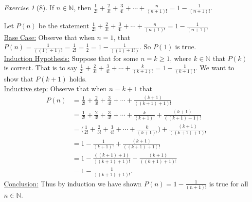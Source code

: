 \documentclass[12pt]{amsart}
\makeatletter
\theoremstyle{remark}
\newtheorem*{exercise}{Exercise}%
\def\NN{\ensuremath{\mathbb N}}
\renewenvironment{proof}[1][\proofname]{\par\doublespacing
  \pushQED{\qed}%
  \normalfont \topsep6\p@\@plus6\p@\relax
  \list{}{%
    \settowidth{\leftmargin}{\itshape\proofname:\hskip\labelsep}%
    \setlength{\labelwidth}{0pt}%
    \setlength{\itemindent}{-\leftmargin}%
  }%
  \item[\hskip\labelsep\itshape#1\@addpunct{:}]\ignorespaces
}{%
  \popQED\endlist\@endpefalse
  \singlespacing
}
\theoremstyle{mycomment}
\makeatother
\begin{document}
\begin{exercise}[8] If $n\in\NN$, then $\frac{1}{2!}+\frac{2}{3!}+\frac{3}{4!}+\cdots+\frac{n}{(n+1)!}=1-\frac{1}{(n+1)!}$.
\begin{proof}%
  Let $P(n)$ be the statement $\frac{1}{2!}+\frac{2}{3!}+\frac{3}{4!}+\cdots+\frac{n}{(n+1)!}=1-\frac{1}{(n+1)!}$ \\
  \underline{Base Case:} Observe that when $n = 1$, that $P(n) = \frac{1}{((1)+1)!} = \frac{1}{2!} = \frac{1}{2} = 1 - \frac{1}{((1) + 1!)}$. So $P(1)$ is true. \\
  \underline{Induction Hypothesis:} Suppose that for some $n = k \geq 1$, where $k \in \NN$ that $P(k)$ is correct. That is to say $\frac{1}{2!} + \frac{2}{3!} + \frac{3}{4!} + \cdots + \frac{k}{(k+1)!} = 1 - \frac{1}{(k+1)!}$. We want to show that $P(k+1)$ holds.\\
  \underline{Inductive step:} Observe that when $n = k+1$ that \\
  \begin{align*}
    P(n) &= \frac{1}{2!} + \frac{2}{3!} + \frac{3}{4!} + \cdots + \frac{(k+1)}{((k+1)+1)!} \\
         &= \frac{1}{2!} + \frac{2}{3!} + \frac{3}{4!} + \cdots + \frac{k}{(k+1)!} + \frac{(k+1)}{((k+1)+1)!}  \\
         &= \biggl(\frac{1}{2!} + \frac{2}{3!} + \frac{3}{4!} + \cdots + \frac{k}{(k+1)!}\biggr) + \frac{(k+1)}{((k+1)+1)!}  \\
         &= 1 - \frac{1}{(k+1)!} + \frac{(k+1)}{((k+1)+1)!}  \\
         &= 1 - \frac{((k+1)+1)}{((k+1)+1)!} + \frac{(k+1)}{((k+1)+1)!} \\
         &= 1 - \frac{1}{((k+1)+1)!}.
  \end{align*}
 \underline{Conclusion:} Thus by induction we have shown $P(n) = 1 - \frac{1}{(n+1)!}$ is true for all $n \in \NN$.
\end{proof}
\end{exercise}
\end{document}
